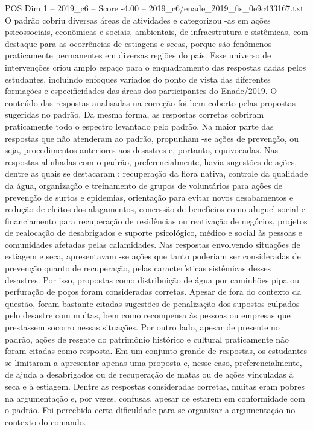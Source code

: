 \begin{textsample}{POS Dim 1 – 2019\_c6 – Score -4.00 – 2019\_c6/enade\_2019\_fis\_0e9c433167.txt}
O padrão cobriu diversas áreas de atividades e categorizou -as em ações psicossociais, econômicas e sociais, ambientais, de infraestrutura e sistêmicas, com destaque para as ocorrências de estiagens e secas, porque são fenômenos praticamente permanentes em diversas regiões do país.
Esse universo de intervenções criou amplo espaço para o enquadramento das respostas dadas pelos estudantes, incluindo enfoques variados do ponto de vista das diferentes formações e especificidades das áreas dos participantes do Enade/2019.
O conteúdo das respostas analisadas na correção foi bem coberto pelas propostas sugeridas no padrão.
Da mesma forma, as respostas corretas cobriram praticamente todo o espectro levantado pelo padrão.
Na maior parte das respostas que não atenderam ao padrão, propunham -se ações de prevenção, ou seja, procedimentos anteriores aos desastres e, portanto, equivocadas.
Nas respostas alinhadas com o padrão, preferencialmente, havia sugestões de ações, dentre as quais se destacaram : recuperação da flora nativa, controle da qualidade da água, organização e treinamento de grupos de voluntários para ações de prevenção de surtos e epidemias, orientação para evitar novos desabamentos e redução de efeitos dos alagamentos, concessão de benefícios como aluguel social e financiamento para recuperação de residências ou reativação de negócios, projetos de realocação de desabrigados e suporte psicológico, médico e social às pessoas e comunidades afetadas pelas calamidades.
Nas respostas envolvendo situações de estiagem e seca, apresentavam -se ações que tanto poderiam ser consideradas de prevenção quanto de recuperação, pelas características sistêmicas desses desastres.
Por isso, propostas como distribuição de água por caminhões pipa ou perfuração de poços foram consideradas corretas.
Apesar de fora do contexto da questão, foram bastante citadas sugestões de penalização dos supostos culpados pelo desastre com multas, bem como recompensa às pessoas ou empresas que prestassem socorro nessas situações.
Por outro lado, apesar de presente no padrão, ações de resgate do patrimônio histórico e cultural praticamente não foram citadas como resposta.
Em um conjunto grande de respostas, os estudantes se limitaram a apresentar apenas uma proposta e, nesse caso, preferencialmente, de ajuda a desabrigados ou de recuperação de matas ou de ações vinculadas à seca e à estiagem.
Dentre as respostas consideradas corretas, muitas eram pobres na argumentação e, por vezes, confusas, apesar de estarem em conformidade com o padrão.
Foi percebida certa dificuldade para se organizar a argumentação no contexto do comando.

\end{textsample}
